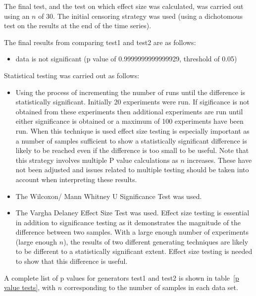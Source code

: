 \documentclass[]{article}
\begin{document}
The final test, and the test on which effect size was calculated, was carried out using an $n$ of 30. The initial censoring strategy was used (using a dichotomous test on the results at the end of the time series). 

The final results from comparing test1 and test2 are as follows:
\begin{itemize}
\item{data is not significant (p value of 0.9999999999999929, threshold of 0.05)}
\end{itemize}

Statistical testing was carried out as follows: 
\begin{itemize}
\item{Using the process of incrementing the number of runs until the difference is statistically significant. Initially 20 experiments were run. If sigificance is not obtained from these experiments then additional experiments are run until either significance is obtained or a maximum of 100 experiments have been run. When this technique is used effect size testing is especially important as a number of samples sufficient to show a statistically significant difference is likely to be reached even if the difference is too small to be useful. Note that this strategy involves multiple P value calculations as $n$ increases. These have not been adjusted and issues related to multiple testing should be taken into account when interpreting these results.
}
\item{The Wilcoxon/ Mann Whitney U Significance Test was used.}
\item{The Vargha Delaney Effect Size Test was used. Effect size testing is essential in addition to significance testing as it demonstrates the magnitude of the difference between two samples. With a large enough number of experiments (large enough $n$), the results of two different generating techniques are likely to be different to a statistically significant extent. Effect size testing is needed to show that this difference is useful.}
\end{itemize}A complete list of p values for generators test1 and test2 is shown in table~\ref{p value tests}, with $n$ corresponding to the number of samples in each data set.
\end{document}
